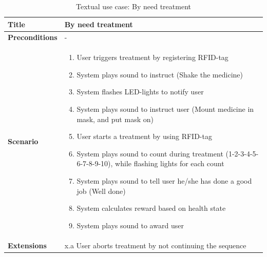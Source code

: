 \begin{table}[H]
\begin{tabular}{|p{4.0cm} | p{9.0cm} |}
\hline
\textbf{Title} & By need treatment \\
\hline
\textbf{Preconditions} & - \\
\hline 
\textbf{Scenario} & 
	\begin{enumerate}
	  \item User triggers treatment by registering RFID-tag
	  \item System plays sound to instruct (Shake the medicine)
	  \item System flashes LED-lights to notify user
	  \item System plays sound to instruct user (Mount medicine in mask, and put mask on)
	  \item User starts a treatment by using RFID-tag
	  \item System plays sound to count during treatment (1-2-3-4-5-6-7-8-9-10), while flashing lights for each count
	  \item System plays sound to tell user he/she has done a good job (Well done)
	  \item System calculates reward based on health state
	  \item System plays sound to award user
	\end{enumerate}
\\
\hline
	\textbf{Extensions} & 
		x.a User aborts treatment by not continuing the sequence
\\
\hline
\end{tabular}
\caption{Textual use case: By need treatment}
\label{tab:textual-use-case}
\end{table}


